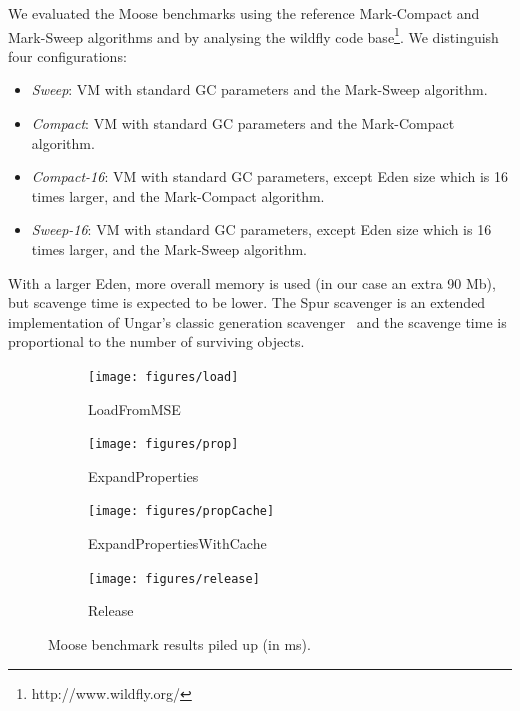 \documentclass[10pt, sigplan]{acmart}
\begin{document}
We evaluated the Moose benchmarks using the reference Mark-Compact and Mark-Sweep algorithms and by analysing the wildfly code base\footnote{http://www.wildfly.org/}. We distinguish four configurations:
\begin{itemize}
\item \emph{Sweep}: VM with standard GC parameters and the Mark-Sweep algorithm.
\item \emph{Compact}: VM with standard GC parameters and the Mark-Compact algorithm.
\item \emph{Compact-16}: VM with standard GC parameters, except Eden size which is 16 times larger, and the Mark-Compact algorithm.
\item \emph{Sweep-16}: VM with standard GC parameters, except Eden size which is 16 times larger, and the Mark-Sweep algorithm.
\end{itemize}
With a larger Eden, more overall memory is used (in our case an extra 90 Mb), but scavenge time is expected to be lower. The Spur scavenger is an extended implementation of Ungar's classic generation scavenger~\cite{Scavenger} and the scavenge time is proportional to the number of surviving objects.

%
\begin{figure}[thb]
	\centering
    
    \begin{subfigure}[b]{.48\textwidth}
	\texttt{[image: figures/load]} 
	\caption{LoadFromMSE\vspace{0.2cm}}
   	\end{subfigure}\hspace{0.03\textwidth}%
   	\begin{subfigure}[b]{.48\textwidth}
	\texttt{[image: figures/prop]} 
	\caption{ExpandProperties\vspace{0.2cm}}
   	\end{subfigure}	
	\begin{subfigure}[b]{.48\textwidth}
	\texttt{[image: figures/propCache]} 
	\caption{ExpandPropertiesWithCache}
	\end{subfigure}\hspace{0.03\textwidth}%
	   	\begin{subfigure}[b]{.48\textwidth}
	\texttt{[image: figures/release]} 
	\caption{Release}
   	\end{subfigure}

   	   	    	
\caption{Moose benchmark results piled up (in ms).} \label{MooseRes1}
\end{figure}
\end{document}

